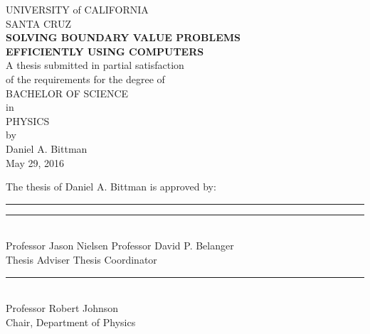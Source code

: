 \documentclass[12pt]{article}
\begin{document}
\begin{center}

	UNIVERSITY of CALIFORNIA\\
	\vspace{2mm}
	SANTA CRUZ\\
	\vspace{10mm}
	{\large\textbf{\textsc{SOLVING BOUNDARY VALUE PROBLEMS\\EFFICIENTLY USING COMPUTERS}}}\\
	\vspace{10mm}
	A thesis submitted in partial satisfaction\\of the requirements for the degree of\\
	\vspace{5mm}
	\textsc{BACHELOR OF SCIENCE}\\
	\vspace{3mm}
	in\\
	\vspace{3mm}
	\textsc{PHYSICS}\\
	\vspace{5mm}
	by\\
	\vspace{2mm}
	Daniel A. Bittman\\
	May 29, 2016\\

	\vspace{2in}

	The thesis of Daniel A. Bittman is approved by:\\
	\vspace{1in}

	\rule{2.5in}{2pt}\hfill
	\rule{2.5in}{2pt} \\
	Professor Jason Nielsen \hfill Professor David P. Belanger\\
	Thesis Adviser \hfill Thesis Coordinator\\

	\vspace{15mm}
	\rule{2.5in}{2pt}\\
	Professor Robert Johnson\\
	Chair, Department of Physics

\end{center}

\clearpage
\setcounter{page}{1}
\renewcommand{\thepage}{\roman{page}}
\end{document}

